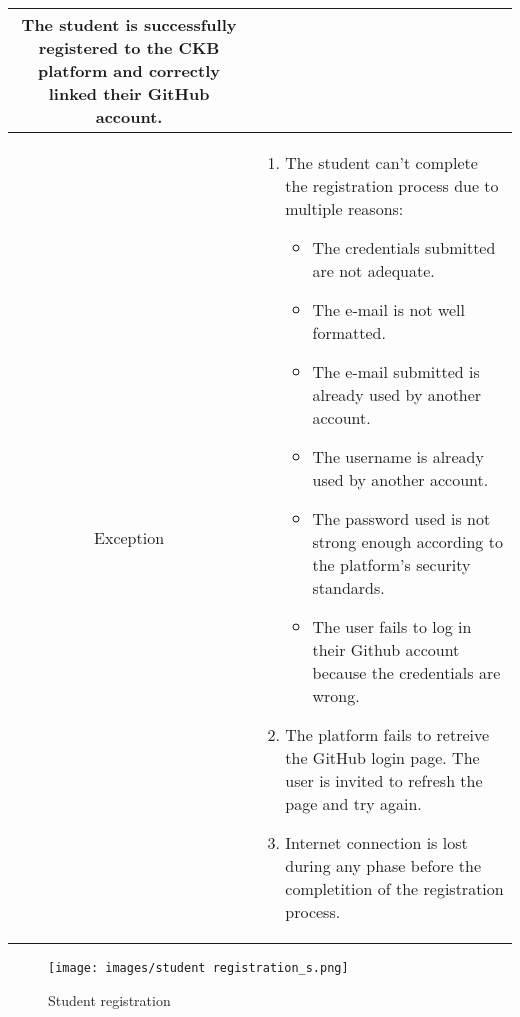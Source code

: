 \documentclass[a4paper, 11pt, titlepage]{article}
\begin{document}
\begin{center}
\begin{tabularx}{\linewidth} {|c|X|}
            The student is successfully registered to the CKB platform and correctly 
            linked their GitHub account.\\ 
        \hline
        Exception & 
        \begin{enumerate}
            \item The student can't complete the registration process due to multiple reasons:
           \begin{itemize} 
            \item The credentials submitted are not adequate.
            \item The e-mail is not well formatted.
            \item The e-mail submitted is already used by another account. 
            \item The username is already used by another account.
            \item The password used is not strong enough according to the platform's security standards.
            \item The user fails to log in their Github account because the credentials are wrong.
           \end{itemize}
           \item The platform fails to retreive the GitHub login page. The user is invited to refresh the page and try again.  
           \item Internet connection is lost during any phase before the completition of the registration process.
        \end{enumerate}\\
        \hline
        
    \end{tabularx}
\end{center}
\newpage
\begin{figure}[h!]
    \centering
    \texttt{[image: images/student registration\_s.png]}
    \caption{Student registration}
    \label{fig:seq_diag_student_reg}
    
\end{figure}

\clearpage 
\end{document}

